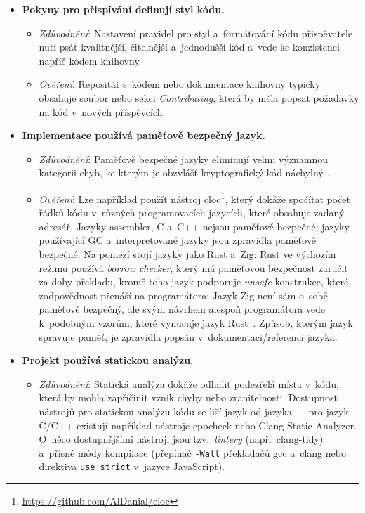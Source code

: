 \begin{itemize}
    \item \textbf{Pokyny pro přispívání definují styl kódu.} 
    \begin{itemize}[beginpenalty=10000]
        \item \textit{Zdůvodnění}: Nastavení pravidel pro styl a~formátování kódu přispěvatele nutí psát kvalitnější, čitelnější a~jednodušší kód a~vede ke konzistenci napříč kódem knihovny.

        \item \textit{Ověření}: Repositář s~kódem nebo dokumentace knihovny typicky obsahuje soubor nebo sekci \textit{Contributing}, která by měla popsat požadavky na kód v~nových příspěvcích.
    \end{itemize}
    
    \item \textbf{Implementace používá paměťově bezpečný jazyk.} 
    \begin{itemize}[beginpenalty=10000]
        \item \textit{Zdůvodnění}: Paměťově bezpečné jazyky eliminují velmi významnou kategorii chyb, ke kterým je obzvlášť kryptografický kód náchylný~\cite{youreallyshouldnt}.

        \item \textit{Ověření}: Lze například použít nástroj cloc\footnote{\url{https://github.com/AlDanial/cloc}}, který dokáže spočítat počet řádků kódu v~různých programovacích jazycích, které obsahuje zadaný adresář. Jazyky assembler, C a~C++ nejsou paměťově bezpečné; jazyky používající GC a~interpretované jazyky jsou zpravidla paměťově bezpečné. Na pomezí stojí jazyky jako Rust a~Zig: Rust ve výchozím režimu používá \textit{borrow checker}, který má paměťovou bezpečnost zaručit za doby překladu, kromě toho jazyk podporuje \textit{unsafe} konstrukce, které zodpovědnost přenáší na pro\-g\-ra\-má\-to\-ra; Jazyk Zig není sám o~sobě paměťově bezpečný, ale svým návrhem alespoň pro\-g\-ra\-má\-to\-ra vede k~podobným vzorům, které vynucuje jazyk Rust~\cite{ziglangdoc}. Způsob, kterým jazyk spravuje paměť, je zpravidla popsán v~dokumentaci/referenci jazyka.
    \end{itemize}
    
    \item \textbf{Projekt používá statickou analýzu.} 
    \begin{itemize}[beginpenalty=10000]
        \item \textit{Zdůvodnění}: Statická analýza dokáže odhalit podezřelá místa v~kódu, která by mohla zapříčinit vznik chyby nebo zranitelnosti. Dostupnost nástrojů pro statickou analýzu kódu se liší jazyk od jazyka --- pro jazyk C/C++ existují například nástroje cppcheck nebo Clang Static Analyzer. O~něco dostupnějšími nástroji jsou tzv.~\textit{lintery} (např.\ clang-tidy) a~přísné módy kompilace (přepínač \texttt{-Wall} překladačů gcc a~clang nebo direktiva \texttt{use strict} v~jazyce JavaScript).


\end{itemize}
\end{itemize}
